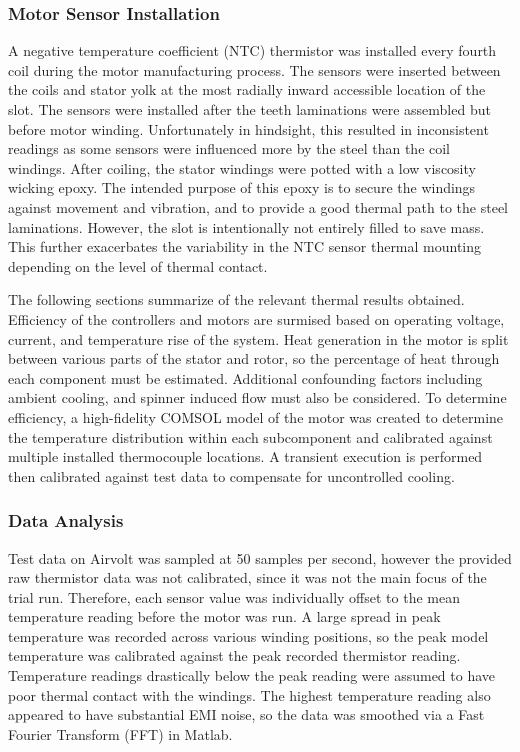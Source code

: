 \documentclass[]{aiaa-tc}%
\begin{document}
\subsubsection{Motor Sensor Installation}
A negative temperature coefficient (NTC) thermistor was installed every fourth coil during the motor manufacturing process. The sensors were inserted between the coils and stator yolk at the most radially inward accessible location of the slot. The sensors were installed after the teeth laminations were assembled but before motor winding. Unfortunately in hindsight, this resulted in inconsistent readings as some sensors were influenced more by the steel than the coil windings. After coiling, the stator windings were potted with a low viscosity wicking epoxy. The intended purpose of this epoxy is to secure the windings against movement and vibration, and to provide a good thermal path to the steel laminations. However, the slot is intentionally not entirely filled to save mass. This further exacerbates the variability in the NTC sensor thermal mounting depending on the level of thermal contact.

The following sections summarize of the relevant thermal results obtained. Efficiency of the controllers and motors are surmised based on operating voltage, current, and temperature rise of the system. Heat generation in the motor is split between various parts of the stator and rotor, so the percentage of heat through each component must be estimated. Additional confounding factors including ambient cooling, and spinner induced flow must also be considered. To determine efficiency, a high-fidelity COMSOL model of the motor was created to determine the temperature distribution within each subcomponent and calibrated against multiple installed thermocouple locations. A transient execution is performed then calibrated against test data to compensate for uncontrolled cooling.


\subsubsection{Data Analysis}

Test data on Airvolt was sampled at 50 samples per second, however the provided raw thermistor data was not calibrated, since it was not the main focus of the trial run. Therefore, each sensor value was individually offset to the mean temperature reading before the motor was run. A large spread in peak temperature was recorded across various winding positions, so the peak model temperature was calibrated against the peak recorded thermistor reading. Temperature readings drastically below the peak reading were assumed to have poor thermal contact with the windings. The highest temperature reading also appeared to have substantial EMI noise, so the data was smoothed via a Fast Fourier Transform (FFT) in Matlab.
\end{document}
